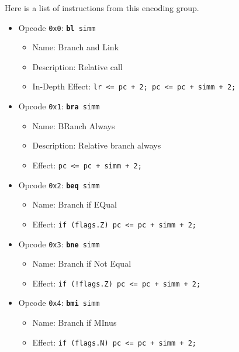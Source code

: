 \documentclass{article}
\begin{document}
	Here is a list of instructions from this encoding group.

	\singlespacing
	\begin{itemize}
		\item Opcode \texttt{0x0}:
			\texttt{\textbf{bl} simm}
		\begin{itemize}
			\item Name: Branch and Link
			\item Description: Relative call
			\item In-Depth Effect:
				\texttt{lr <= pc + 2; pc <= pc + simm + 2;}
		\end{itemize}

		\item Opcode \texttt{0x1}:
			\texttt{\textbf{bra} simm}
		\begin{itemize}
			\item Name: BRanch Always
			\item Description: Relative branch always
			\item Effect:
				\texttt{pc <= pc + simm + 2;}
		\end{itemize}

		\item Opcode \texttt{0x2}:
			\texttt{\textbf{beq} simm}
		\begin{itemize}
			\item Name: Branch if EQual
			\item Effect:
				\texttt{if (flags.Z) pc <= pc + simm + 2;}
		\end{itemize}

		\item Opcode \texttt{0x3}:
			\texttt{\textbf{bne} simm}
		\begin{itemize}
			\item Name: Branch if Not Equal
			\item Effect:
				\texttt{if (!flags.Z) pc <= pc + simm + 2;}
		\end{itemize}

		\item Opcode \texttt{0x4}:
			\texttt{\textbf{bmi} simm}
		\begin{itemize}
			\item Name: Branch if MInus
			\item Effect:
				\texttt{if (flags.N) pc <= pc + simm + 2;}
		\end{itemize}


\end{itemize}
\end{document}
